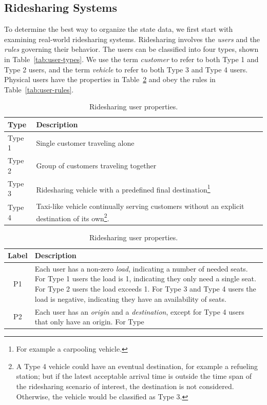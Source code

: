 \documentclass{article}
\newcommand{\hi}[1]{\noindent {\bf #1}}     %
\theoremstyle{definition}                   %
\begin{document}
\subsection{Ridesharing Systems}
\label{sec:ridesharing-systems}
To determine the best way to organize the state data, we first start with
examining real-world ridesharing systems.  Ridesharing involves the
\emph{users} and the \emph{rules} governing their behavior. The users can be
classified into four types, shown in Table~\ref{tab:user-types}.  We use the
term \emph{customer} to refer to both Type 1 and Type 2 users, and the term
\emph{vehicle} to refer to both Type 3 and Type 4 users.  Physical users have
the properties in Table~\ref{tab:user-properties} and obey the rules in
Table~\ref{tab:user-rules}.
\begin{table}[h]
\centering
\small
\caption{Types of ridesharing users.}
\label{tab:user-types}
\begin{tabular}{|l|l|}
\hline
Type   & Description \\
\hline
Type 1 & Single customer traveling alone \\
Type 2 & Group of customers traveling together \\
\hline
Type 3 & Ridesharing vehicle with a predefined final
    destination\footnote{For example a carpooling vehicle.} \\
Type 4 & Taxi-like vehicle continually serving customers without an
    explicit destination of its own\footnote{A Type 4 vehicle could have an
    eventual destination, for example a refueling station; but if the latest
    acceptable arrival time is outside the time span of the ridesharing
    scenario of interest, the destination is not considered. Otherwise, the
    vehicle would be classified as Type 3.}. \\
\hline
\end{tabular}
\caption{Ridesharing user properties.}
\label{tab:user-properties}
\begin{tabular}{|c|p{140mm}|}
\hline
Label & Description \\
\hline
P1 & \hi{Load.} Each user has a non-zero \emph{load}, indicating a
number of needed seats. For Type 1 users the load is 1, indicating they only
need a single seat. For Type 2 users the load exceeds 1. For Type 3 and Type 4
users the load is negative, indicating they have an availability of seats. \\
\hline
P2 & \hi{Origin and Destination.} Each user has an \emph{origin} and a
\emph{destination}, except for Type 4 users that only have an origin.  For Type

\end{tabular}
\end{table}
\end{document}
